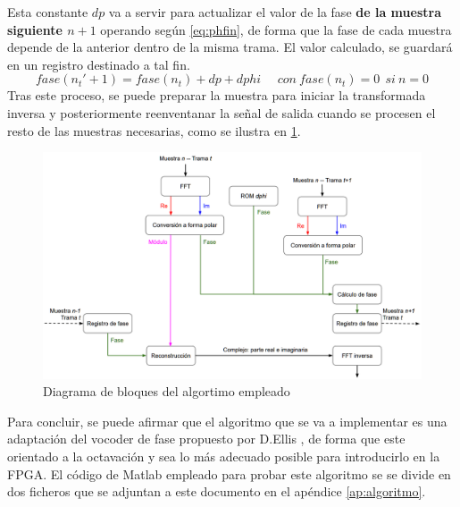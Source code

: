 Esta constante $dp$ va a servir para actualizar el valor de la fase \textbf{de la muestra siguiente $n+1$} operando según \ref{eq:phfin}, de forma que la fase de cada muestra depende de la anterior dentro de la misma trama. El valor calculado, se guardará en un registro destinado a tal fin.
\begin{equation}
\label{eq:phfin}
fase(n_{t}' + 1) = fase(n_{t}) + dp + dphi~~~~~~con~fase(n_{t}) = 0~~si~n=0
\end{equation} 
Tras este proceso, se puede preparar la muestra para iniciar la transformada inversa y posteriormente reenventanar la señal de salida cuando se procesen el resto de las muestras necesarias, como se ilustra en \ref{fig:esqalgoritmo}.


\begin{figure}[!t]
\begin{center}
\includegraphics[width=15cm]{img/esq-alg.png}
\caption{\label{fig:esqalgoritmo}Diagrama de bloques del algortimo empleado}
\end{center}
\end{figure}

Para concluir, se puede afirmar que el algoritmo que se va a implementar es una adaptación del vocoder de fase propuesto por D.Ellis \cite{Ellis}, de forma que este orientado a la octavación y sea lo más adecuado posible para introducirlo en la FPGA. El código de Matlab empleado para probar este algoritmo se se divide en dos ficheros que se adjuntan a este documento en el apéndice \ref{ap:algoritmo}.